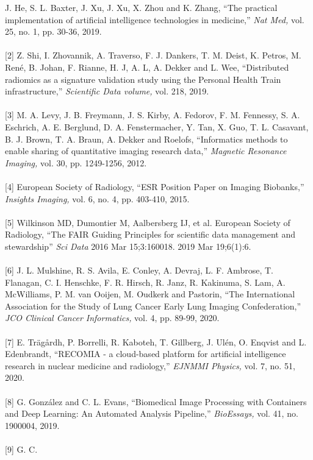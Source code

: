 \printbibliography
[1]  J. He, S. L. Baxter, J. Xu, J. Xu, X. Zhou and K. Zhang, ``The
practical implementation of artificial intelligence technologies in
medicine,'' \emph{Nat Med,} vol. 25, no. 1, pp. 30-36, 2019. \\\\{[}2{]} Z.
Shi, I. Zhovannik, A. Traverso, F. J. Dankers, T. M. Deist, K. Petros,
M. René, B. Johan, F. Rianne, H. J, A. L, A. Dekker and L. Wee,
``Distributed radiomics as a signature validation study using the
Personal Health Train infrastructure,'' \emph{Scientific Data volume,}
vol. 218, 2019. \\\\{[}3{]} M. A. Levy, J. B. Freymann, J. S. Kirby, A.
Fedorov, F. M. Fennessy, S. A. Eschrich, A. E. Berglund, D. A.
Fenstermacher, Y. Tan, X. Guo, T. L. Casavant, B. J. Brown, T. A. Braun,
A. Dekker and Roelofs, ``Informatics methods to enable sharing of
quantitative imaging research data,'' \emph{Magnetic Resonance Imaging,}
vol. 30, pp. 1249-1256, 2012. \\\\{[}4{]} European Society of Radiology,
``ESR Position Paper on Imaging Biobanks,'' \emph{Insights Imaging,}
vol. 6, no. 4, pp. 403-410, 2015.\\\\{[}5{]} Wilkinson MD, Dumontier M, Aalbersberg IJ, et al. European Society of Radiology,
``The FAIR Guiding Principles for scientific data management and stewardship'' \emph{Sci Data}  2016 Mar 15;3:160018.  2019 Mar 19;6(1):6. 
\\\\{[}6{]} J. L. Mulshine, R. S. Avila, E. Conley, A.
Devraj, L. F. Ambrose, T. Flanagan, C. I. Henschke, F. R. Hirsch, R.
Janz, R. Kakinuma, S. Lam, A. McWilliams, P. M. van Ooijen, M. Oudkerk
and Pastorin, ``The International Association for the Study of Lung
Cancer Early Lung Imaging Confederation,'' \emph{JCO Clinical Cancer
Informatics,} vol. 4, pp. 89-99, 2020. \\\\{[}7{]} E. Trägårdh, P. Borrelli,
R. Kaboteh, T. Gillberg, J. Ulén, O. Enqvist and L. Edenbrandt,
``RECOMIA - a cloud-based platform for artificial intelligence research
in nuclear medicine and radiology,'' \emph{EJNMMI Physics,} vol. 7, no.
51, 2020. \\\\{[}8{]} G. González and C. L. Evans, ``Biomedical Image
Processing with Containers and Deep Learning: An Automated Analysis
Pipeline,'' \emph{BioEssays,} vol. 41, no. 1900004, 2019. \\\\{[}9{]} G. C.
